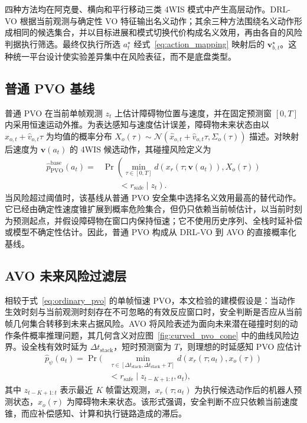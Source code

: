 \documentclass[UTF8,10pt,a4paper,twocolumn]{ctexart}
\begin{document}
四种方法均在阿克曼、横向和平行移动三类 4WIS 模式中产生高层动作。DRL-VO 根据当前观测与确定性 VO 特征输出名义动作；其余三种方法围绕名义动作形成相同的候选集合，并以目标进展和模式切换代价构成名义效用，再由各自的风险判据执行筛选。最终仅执行所选 $a_t^{\star}$ 经式~\ref{eq:action_mapping} 映射后的 $\mathbf v_{b,t}^{\star}$。这种统一平台设计使实验差异集中在风险表征，而不是底盘类型。

\subsection{普通 PVO 基线}

普通 PVO 在当前单帧观测 $z_t$ 上估计障碍物位置与速度，并在固定预测窗 $[0,T]$ 内采用恒速运动外推。为表达感知与速度估计误差，障碍物未来状态由以 $\hat{x}_{o,t}+\hat{v}_{o,t}\tau$ 为均值的概率分布 $X_o(\tau)\sim\mathcal N(\hat{x}_{o,t}+\hat{v}_{o,t}\tau,\Sigma_o(\tau))$ 描述。对映射后速度为 $\mathbf v(a_t)$ 的 4WIS 候选动作，其碰撞风险定义为
\begin{equation}
\begin{aligned}
    \hat p_{\mathrm{PVO}}^{\mathrm{base}}(a_t)
    ={}& \Pr\!\left(\min_{\tau\in[0,T]}
    d\!\left(x_r(\tau;\mathbf v(a_t)),X_o(\tau)\right)\right.\\
    &\left.\qquad <r_{\mathrm{safe}}\mid z_t\right).
\end{aligned}
    \label{eq:ordinary_pvo}
\end{equation}
当风险超过阈值时，该基线从普通 PVO 安全集中选择名义效用最高的替代动作。它已经由确定性速度锥扩展到概率危险集合，但仍只依赖当前帧估计，以当前时刻为预测起点，并假设障碍物在窗口内保持恒速；它不使用历史序列、全栈时延补偿或模型不确定性估计。因此，普通 PVO 构成从 DRL-VO 到 AVO 的直接概率化基线。

\subsection{AVO 未来风险过滤层}

\begin{samepage}
相较于式~\ref{eq:ordinary_pvo} 的单帧恒速 PVO，本文检验的建模假设是：当动作生效时刻与当前观测时刻存在不可忽略的有效反应窗口时，安全判断是否应从当前帧几何集合转移到未来占据风险。AVO 将风险表述为面向未来潜在碰撞时刻的动作条件概率推理问题，其几何含义对应图~\ref{fig:curved_pvo_cone} 中的曲线风险边界。设全栈有效时延为 $\Delta t_{\mathrm{stack}}$，短时预测窗为 $T$，则理想的时延感知 PVO 应估计
\begin{equation}
\begin{aligned}
    \hat{p}_{\psi}(a_t)=\Pr(&\min_{\tau\in[\Delta t_{\mathrm{stack}},\Delta t_{\mathrm{stack}}+T]}
    d(x_r(\tau;a_t),x_o(\tau)) \\
    &< r_{\mathrm{safe}} \mid z_{t-K+1:t}, a_t),
\end{aligned}
\label{eq:delay_pvo}
\end{equation}
其中 $z_{t-K+1:t}$ 表示最近 $K$ 帧雷达观测，$x_r(\tau;a_t)$ 为执行候选动作后的机器人预测状态，$x_o(\tau)$ 为障碍物未来状态。该形式强调，安全判断不应只依赖当前速度锥，而应补偿感知、计算和执行链路造成的滞后。
\end{samepage}
\end{document}
